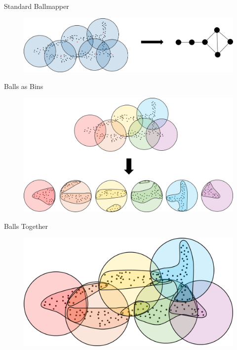\documentclass{beamer}
\begin{document}
\begin{frame}{Standard Ballmapper}
  \begin{figure}
    \begin{center}
      \includegraphics[width=1\textwidth]{prerefined.png}
    \end{center}
  \end{figure}
\end{frame}

\begin{frame}{Balls as Bins}
  \begin{figure}
    \begin{center}
      \hspace*{-.5cm}\includegraphics[width=1.1\textwidth]{ballclustering.png}
    \end{center}
  \end{figure}
\end{frame}

\begin{frame}{Balls Together}
  \begin{figure}
    \begin{center}
      \includegraphics[width=1\textwidth]{intersectingballs.png}
    \end{center}
  \end{figure}
\end{frame}
\end{document}
